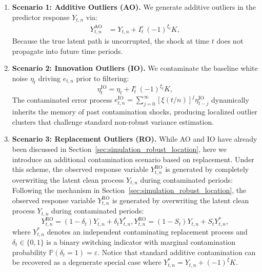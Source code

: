 \documentclass[10pt, a4paper]{article}
\theoremstyle{assumption}
\theoremstyle{definition}
\theoremstyle{theorem}
\begin{document}
\begin{enumerate}[label=(\roman*)]
    \item \textbf{Scenario 1: Additive Outliers (AO).} 
      We generate additive outliers in the predictor response $Y_{t,n}$ via:
    \begin{align*}
        Y_{t,n}^{\text{AO}} &= Y_{t,n} + I_t^\varepsilon \, (-1)^{\xi_t} K, 
    \end{align*}
     Because the true latent path is uncorrupted, the shock at time $t$ does not propagate into future time periods.

    \item \textbf{Scenario 2: Innovation Outliers (IO).} 
    We contaminate the baseline white noise $\eta_t$ driving $e_{t,n}$ prior to filtering:
    \begin{equation*}
        \eta_t^{\text{IO}} = \eta_t + I_t^\varepsilon \, (-1)^{\xi_t} K,
    \end{equation*}
   The contaminated error process $e_{t,n}^{\text{IO}} = \sum_{j=0}^\infty [\xi(t/n)]^j \eta_{t-j}^{\text{IO}}$ dynamically inherits the memory of past contamination shocks, producing localized outlier clusters that challenge standard non-robust variance estimation.

    \item \textbf{Scenario 3: Replacement Outliers (RO).} 
While AO and IO have already been discussed in Section~\ref{sec:simulation_robust_location}, here we introduce an additional contamination scenario based on replacement. Under this scheme, the observed response variable $Y_{t,n}^{\text{RO}}$ is generated by completely overwriting the latent clean process $Y_{t,n}$ during contaminated periods:
Following the mechanism in Section~\ref{sec:simulation_robust_location}, the observed response variable $Y_{t,n}^{\text{RO}}$ is generated by overwriting the latent clean process $Y_{t,n}$ during contaminated periods:
\begin{equation*}
    Y_{t,n}^{\text{RO}} = (1 - \delta_t) Y_{t,n} + \delta_t Y^*_{t,n},
    Y_{t,n}^{\text{RO}} = (1 - S_t) Y_{t,n} + S_t Y^*_{t,n},
\end{equation*}
where $Y^*_{t,n}$ denotes an independent contaminating replacement process and $\delta_t \in \{0, 1\}$ is a binary switching indicator with marginal contamination probability $\mathbb{P}(\delta_t = 1) = \varepsilon$. Notice that standard additive contamination can be recovered as a degenerate special case where $Y^*_{t,n} = Y_{t,n} + (-1)^\xi K$. 


\end{enumerate}
\end{document}
